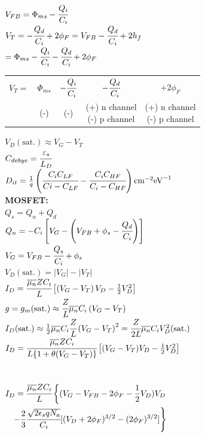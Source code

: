 \documentclass[8pt]{article}
\newcommand{\sect}[1]{\noindent\textbf{#1}\\}
\newcommand\tab[1][1cm]{\hspace*{#1}}
\begin{document}
\begin{multicols*}{2}
\begin{small}
		$ V_{FB} = \Phi_{ms} - \cfrac{Q_i}{C_i} $ \\
		$ V_T = -\cfrac{Q_d}{C_i} + 2\phi_F = V_{FB} - \cfrac{Q_d}{C_i} + 2h_f $ \\
		\tab[0.4cm] $ = \Phi_{ms} - \cfrac{Q_i}{C_i} - \cfrac{Q_d}{C_i} + 2\phi_F $ \\
		\begin{tabular}{l|c|c|c|c}
			$V_T = $ & $ \Phi_{ms} $ & $ -\cfrac{Q_i}{C_i} $ & $ -\cfrac{Q_d}{C_i} $ & $ + 2\phi_F$ \\ 
			& (-) & (-) & \makecell{(+) n channel \\ (-) p channel} & \makecell{(+) n channel \\ (-) p channel}
		\end{tabular}
		$ V_D(\text{sat.}) \approx V_G - V_T $ \\
		$ C_{debye} = \cfrac{\varepsilon_s}{L_D} $ \\
		$ D_{it} = \frac{1}{q} \left( \cfrac{C_iC_{LF}}{Ci - C_{LF}} - \cfrac{C_iC_{HF}}{C_i - C_{HF}} \right) \text{cm}^{-2} \text{eV}^{-1} $ \\
		\sect{MOSFET:}
		$ Q_s = Q_n + Q_d$ \\
		$ Q_n = -C_i \left[ V_G - \left( V_{FB} + \phi_s - \cfrac{Q_d}{C_i} \right)\right] $ \\
		$ V_G = V_{FB} - \cfrac{Q_s}{C_i} + \phi_s $ \\
		$ V_D(\text{sat.}) = |V_G| - |V_T| $ \\
		$ I_D = \cfrac{\overline{\mu_n} Z C_i}{L} \left[ \left( V_G - V_T \right) V_D - \frac{1}{2} V_D^2 \right] $ \\
		$ g = g_m(\text{sat.}) \approx \cfrac{Z}{L} \overline{\mu_n}C_i\left( V_G - V_T \right) $ \\
		$ I_D(\text{sat.}) \approx \frac{1}{2} \overline{\mu_n} C_i \cfrac{Z}{L} \left( V_G - V_T \right)^2 = \cfrac{Z}{2L} \overline{\mu_n}C_iV_D^2(\text{sat.}) $ \\
		$ I_D = \cfrac{\overline{\mu_n} Z C_i}{L \{1 + \theta(V_G - V_T) \}} \left[ (V_G - V_T)V_D - \frac{1}{2} V_D^2 \right] $ \\~\\~\\
		$\begin{aligned}
		I_D = \cfrac{\overline{\mu_n} Z C_i }{L} \left\{ (V_G - V_{FB} - 2\phi_F - \frac{1}{2}V_D)V_D \right. \\
		 \left. - \frac{2}{3} \cfrac{\sqrt{2\epsilon_sqN_a}}{C_i}[(V_D + 2\phi_F)^{3/2} - (2\phi_F)^{3/2}] \right\}
		\end{aligned}$\\~\\~\\

\end{small}
\end{multicols*}
\end{document}
